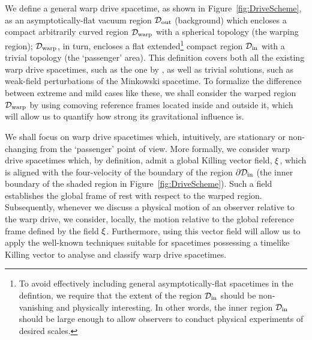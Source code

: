 \documentclass[10pt]{iopart}
\begin{document}
We define a general warp drive spacetime, as shown in Figure~\ref{fig:DriveScheme}, as an asymptotically-flat vacuum region $\mathcal{D}_{\rm out}$ (background) which encloses a compact arbitrarily curved region $\mathcal{D}_{\rm warp}$ with a spherical topology (the warping region); $\mathcal{D}_{\rm warp}$, in turn, encloses a flat extended\footnote{To avoid effectively including general asymptotically-flat spacetimes in the defintion, we require that the extent of the region $\mathcal{D}_{\rm in}$ should be non-vanishing and physically interesting. In other words, the inner region $\mathcal{D}_{\rm in}$ should be large enough to allow observers to conduct physical experiments of desired scales.} compact region $\mathcal{D}_{\rm in}$ with a trivial topology (the `passenger' area). This definition covers both all the existing warp drive spacetimes, such as the one by \cite{Alcubierre1994}, as well as trivial solutions, such as weak-field perturbations of the Minkowski spacetime. To formalize the difference between extreme and mild cases like these, we shall consider the warped region $\mathcal{D}_{\rm warp}$ by using comoving reference frames located inside and outside it, which will allow us to quantify how strong its gravitational influence is.

We shall focus on warp drive spacetimes which, intuitively, are stationary or non-changing from the `passenger' point of view. More formally, we consider warp drive spacetimes which{, by definition,} admit a global Killing vector field, ${\bf \xi}$, which is aligned with the four-velocity of the boundary of the region $\partial\mathcal{D}_{\rm in}$ (the inner boundary of the shaded region in Figure~\ref{fig:DriveScheme}). Such a field establishes the global frame of rest with respect to the warped region. Subsequently, whenever we discuss a physical motion of an observer relative to the warp drive, we consider, locally, the motion relative to the global reference frame defined by the field ${\bf \xi}$. Furthermore, using this vector field will allow us to apply the well-known techniques suitable for spacetimes possessing a timelike Killing vector to analyse and classify warp drive spacetimes.
\end{document}

